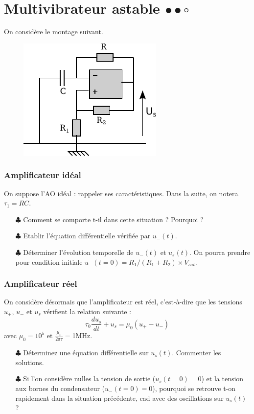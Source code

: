 \documentclass{report}
\begin{document}
\newpage

\section*{Multivibrateur astable $\bullet\bullet\circ$}

On considère le montage suivant.

\begin{figure}[!h]
\centering
\includegraphics[width=0.45\linewidth]{circuit_3.pdf}
\end{figure}

\subsubsection{Amplificateur idéal}

On suppose l'AO idéal : rappeler ses caractéristiques. Dans la suite, on notera $\tau_1=RC$.

\begin{itemize}
	\item[$\clubsuit$] Comment se comporte t-il dans cette situation ? Pourquoi ?
	
	\item[$\clubsuit$] Etablir l'équation différentielle vérifiée par $u_-(t)$.

	\item[$\clubsuit$] Déterminer l'évolution temporelle de  $u_{-}(t)$ et $u_{s}(t)$. On pourra prendre pour condition initiale $u_-(t=0)=R_1/(R_1+R_2)\times V_{sat}$.
\end{itemize}

\subsubsection{Amplificateur réel}

On considère désormais que l'amplificateur est réel, c'est-à-dire que les tensions $u_+$, $u_-$ et $u_s$ vérifient la relation suivante : 
	\begin{equation}
		\tau_0\frac{du_s}{dt} +u_s = \mu_0(u_+-u_-)
	\end{equation}
	avec $\mu_0=10^5$ et $\frac{\mu_0}{2\pi\tau}=$1MHz.
\begin{itemize}
	\item[$\clubsuit$] Déterminez une équation différentielle sur $u_s(t)$. Commenter les solutions. 
	\item[$\clubsuit$] Si l'on considère nulles la tension de sortie ($u_s(t=0)=0$) et la tension aux bornes du condensateur  ($u_-(t=0)=0$), pourquoi se retrouve t-on rapidement dans la situation précédente, cad avec des oscillations sur $u_s(t)$ ?
\end{itemize}
\end{document}
